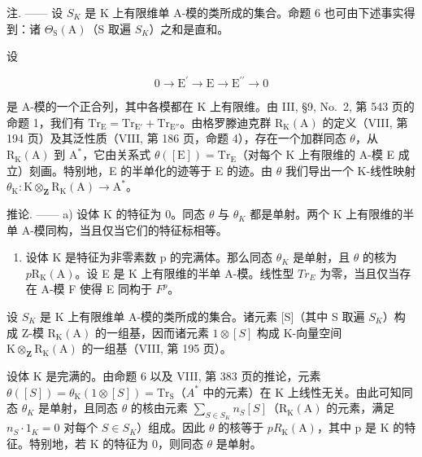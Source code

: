 注. —— 设 \(S_{K}\) 是 K 上有限维单 A-模的类所成的集合。命题 6 也可由下述事实得到：诸 \(\Theta_{\mathrm{S}}(\mathrm{A})\)（S 取遍 \(S_{K}\)）之和是直和。

设

\[
0 \longrightarrow \mathrm{E} ^ {\prime} \longrightarrow \mathrm{E} \longrightarrow \mathrm{E} ^ {\prime \prime} \longrightarrow 0
\]

是 A-模的一个正合列，其中各模都在 K 上有限维。由 III, §9, No.~2, 第 543 页的命题 1，我们有 \(\mathrm{Tr}_{\mathrm{E}} = \mathrm{Tr}_{\mathrm{E}'} + \mathrm{Tr}_{\mathrm{E}''}\)。由格罗滕迪克群 \(\mathrm{R}_{\mathrm{K}}(\mathrm{A})\) 的定义（VIII, 第 194 页）及其泛性质（VIII, 第 186 页，命题 4），存在一个加群同态 \(\theta\)，从 \(\mathrm{R}_{\mathrm{K}}(\mathrm{A})\) 到 \(\mathrm{A}^*\)，它由关系式 \(\theta([\mathrm{E}]) = \mathrm{Tr}_{\mathrm{E}}\)（对每个 K 上有限维的 A-模 E 成立）刻画。特别地，E 的半单化的迹等于 E 的迹。由 \(\theta\) 我们导出一个 K-线性映射 \(\theta_{\mathrm{K}}: \mathrm{K} \otimes_{\mathbf{Z}} \mathrm{R}_{\mathrm{K}}(\mathrm{A}) \to \mathrm{A}^*\)。

推论. —— a) 设体 K 的特征为 0。同态 \(\theta\) 与 \(\theta_{K}\) 都是单射。两个 K 上有限维的半单 A-模同构，当且仅当它们的特征标相等。

\begin{enumerate}
\def\labelenumi{\alph{enumi})}
\setcounter{enumi}{1}
\tightlist
\item
  设体 K 是特征为非零素数 p 的完满体。那么同态 \(\theta_{K}\) 是单射，且 \(\theta\) 的核为 \(p\mathrm{R}_{\mathrm{K}}(\mathrm{A})\)。设 E 是 K 上有限维的半单 A-模。线性型 \(Tr_{E}\) 为零，当且仅当存在 A-模 F 使得 E 同构于 \(F^{p}\)。
\end{enumerate}

设 \(S_{K}\) 是 K 上有限维单 A-模的类所成的集合。诸元素 {[}S{]}（其中 S 取遍 \(S_{K}\)）构成 Z-模 \(\mathrm{R}_{\mathrm{K}}(\mathrm{A})\) 的一组基，因而诸元素 \(1 \otimes [S]\) 构成 K-向量空间 \(\mathrm{K} \otimes_{\mathbf{Z}} \mathrm{R}_{\mathrm{K}}(\mathrm{A})\) 的一组基（VIII, 第 195 页）。

设体 K 是完满的。由命题 6 以及 VIII, 第 383 页的推论，元素 \(\theta([S]) = \theta_{\mathrm{K}}(1 \otimes [S]) = \mathrm{Tr}_{\mathrm{S}}\)（\(A^{*}\) 中的元素）在 K 上线性无关。由此可知同态 \(\theta_{K}\) 是单射，且同态 \(\theta\) 的核由元素 \(\sum_{S \in S_{K}} n_{S}[S]\)（\(\mathrm{R}_{\mathrm{K}}(\mathrm{A})\) 的元素，满足 \(n_{S} \cdot 1_{K} = 0\) 对每个 \(S \in S_{K}\)）组成。因此 \(\theta\) 的核等于 \(p R_{\mathrm{K}}(\mathrm{A})\)，其中 p 是 K 的特征。特别地，若 K 的特征为 0，则同态 \(\theta\) 是单射。

